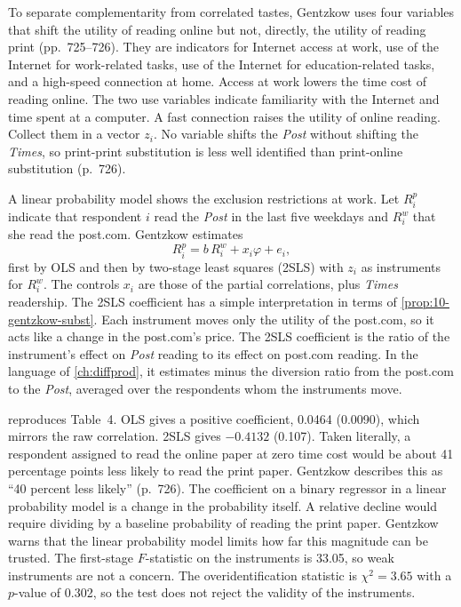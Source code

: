 To separate complementarity from correlated tastes, Gentzkow uses four variables that shift the utility of reading
online but not, directly, the utility of reading print (pp.~725--726). They are indicators for Internet access at work,
use of the Internet for work-related tasks, use of the Internet for education-related tasks, and a high-speed
connection at home. Access at work lowers the time cost of reading online. The two use variables indicate familiarity
with the Internet and time spent at a computer. A fast connection raises the utility of online reading. Collect them
in a vector $z_i$. No variable shifts the \textit{Post} without shifting the \textit{Times}, so print-print
substitution is less well identified than print-online substitution (p.~726).

A linear probability model shows the exclusion restrictions at work. Let $R^p_i$ indicate that respondent $i$ read the
\textit{Post} in the last five weekdays and $R^w_i$ that she read the post.com. Gentzkow estimates
\begin{equation}\label{eq:10-gentzkow-lpm}
  R^p_i = b\,R^w_i + x_i\varphi + e_i ,
\end{equation}
first by OLS and then by two-stage least squares (2SLS) with $z_i$ as instruments for $R^w_i$. The controls $x_i$ are
those of the partial correlations, plus \textit{Times} readership. The 2SLS coefficient has a simple interpretation in
terms of \cref{prop:10-gentzkow-subst}. Each instrument moves only the utility of the post.com, so it acts like a change
in the post.com's price. The 2SLS coefficient is the ratio of the instrument's effect on \textit{Post} reading to its
effect on post.com reading. In the language of \cref{ch:diffprod}, it estimates minus the diversion ratio from the
post.com to the \textit{Post}, averaged over the respondents whom the instruments move.

 reproduces Table~4. OLS gives a positive coefficient, 0.0464 (0.0090), which mirrors the
raw correlation. 2SLS gives $-0.4132$ (0.107). Taken literally, a respondent assigned to read the online paper at zero
time cost would be about 41 percentage points less likely to read the print paper. Gentzkow describes this as
``40 percent less likely'' (p.~726). The coefficient on a binary regressor in a linear probability model is a change
in the probability itself. A relative decline would require dividing by a baseline probability of reading the
print paper. Gentzkow warns that the linear
probability model limits how far this magnitude can be trusted. The first-stage $F$-statistic on the instruments is
33.05, so weak instruments are not a concern. The overidentification statistic is $\chi^2 = 3.65$ with a $p$-value of
0.302, so the test does not reject the validity of the instruments.

